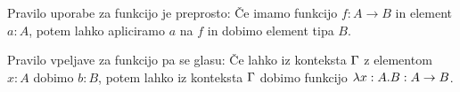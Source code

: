 \begin{primer}
    Pravilo uporabe za funkcijo je preprosto: Če imamo funkcijo \(f : A \rightarrow B\) in element \(a : A\), potem lahko apliciramo \(a\) na \(f\) in dobimo element tipa \(B\).
    \begin{prooftree}
    \end{prooftree}
    Pravilo vpeljave za funkcijo pa se glasu: Če lahko iz konteksta \(\Gamma\) z elementom \(x: A\) dobimo \(b : B\), potem lahko iz konteksta \(\Gamma\) dobimo funkcijo \(\lambda x : A. B : A \rightarrow B\). 

    \begin{prooftree}
    \end{prooftree}
\end{primer}
